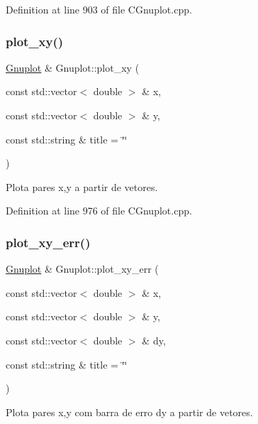 Definition at line 903 of file C\+Gnuplot.\+cpp.

\mbox{\label{class_gnuplot_a777b6a5474951d6d023dff4237d80a2b}} 
\subsubsection{\texorpdfstring{plot\+\_\+xy()}{plot\_xy()}}
{\footnotesize\ttfamily \hyperlink{class_gnuplot}{Gnuplot} \& Gnuplot\+::plot\+\_\+xy (\begin{DoxyParamCaption}\item[{const std\+::vector$<$ double $>$ \&}]{x,  }\item[{const std\+::vector$<$ double $>$ \&}]{y,  }\item[{const std\+::string \&}]{title = {\ttfamily \char`\"{}\char`\"{}} }\end{DoxyParamCaption})}



Plota pares x,y a partir de vetores. 



Definition at line 976 of file C\+Gnuplot.\+cpp.

\mbox{\label{class_gnuplot_a3dd3934b09094a9ba48035a2edf4d4fd}} 
\subsubsection{\texorpdfstring{plot\+\_\+xy\+\_\+err()}{plot\_xy\_err()}}
{\footnotesize\ttfamily \hyperlink{class_gnuplot}{Gnuplot} \& Gnuplot\+::plot\+\_\+xy\+\_\+err (\begin{DoxyParamCaption}\item[{const std\+::vector$<$ double $>$ \&}]{x,  }\item[{const std\+::vector$<$ double $>$ \&}]{y,  }\item[{const std\+::vector$<$ double $>$ \&}]{dy,  }\item[{const std\+::string \&}]{title = {\ttfamily \char`\"{}\char`\"{}} }\end{DoxyParamCaption})}



Plota pares x,y com barra de erro dy a partir de vetores. 



